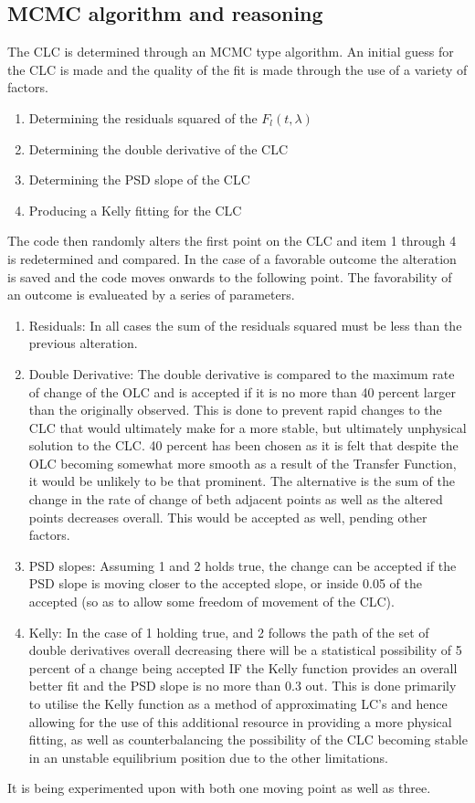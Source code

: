 \documentclass[twocolumn]{article}
\begin{document}
\subsection{MCMC algorithm and reasoning}
The CLC is determined through an MCMC type algorithm. An initial guess for the CLC is made and the quality of the fit is made through the use of a variety of factors. 
\begin{enumerate}
\item Determining the residuals squared of the $F_l(t,\lambda)$
\item Determining the double derivative of the CLC
\item Determining the PSD slope of the CLC
\item Producing a Kelly fitting for the CLC
\end{enumerate}
The code then randomly alters the first point on the CLC and item 1 through 4 is redetermined and compared. In the case of a favorable outcome the alteration is saved and the code moves onwards to the following point. The favorability of an outcome is evalueated by a series of parameters. 
\begin{enumerate}
\item Residuals: In all cases the sum of the residuals squared must be less than the previous alteration.
\item Double Derivative: The double derivative is compared to the maximum rate of change of the OLC and is accepted if it is no more than 40 percent larger than the originally observed. This is done to prevent rapid changes to the CLC that would ultimately make for a more stable, but ultimately unphysical solution to the CLC. 40 percent has been chosen as it is felt that despite the OLC becoming somewhat more smooth as a result of the Transfer Function, it would be unlikely to be that prominent. The alternative is the sum of the change in the rate of change of beth adjacent points as well as the altered points decreases overall. This would be accepted as well, pending other factors.
\item PSD slopes: Assuming 1 and 2 holds true, the change can be accepted if the PSD slope is moving closer to the accepted slope, or inside 0.05 of the accepted (so as to allow some freedom of movement of the CLC).
\item Kelly: In the case of 1 holding true, and 2 follows the path of the set of double derivatives overall decreasing there will be a statistical possibility of 5 percent of a change being accepted IF the Kelly function provides an overall better fit and the PSD slope is no more than 0.3 out. This is done primarily to utilise the Kelly function as a method of approximating LC's and hence allowing for the use of this additional resource in providing a more physical fitting, as well as counterbalancing the possibility of the CLC becoming stable in an unstable equilibrium position due to the other limitations.
\end{enumerate}
It is being experimented upon with both one moving point as well as three. 
\end{document}
